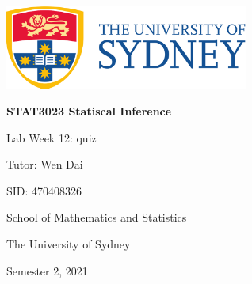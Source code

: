\includegraphics[width=8cm]{./UsydLogo}

\vspace{1cm}


\horline
{\centering\bfseries \Large \textsc{STAT3023} Statiscal Inference

}
\horline

\vspace{3cm}

{\large \centering Lab Week 12: quiz

}

{\centering

\vspace{1cm}

Tutor: Wen Dai

SID: 470408326

\vspace{1cm}

School of Mathematics and Statistics

The University of Sydney

\vfill

Semester 2, 2021\newpage

}
